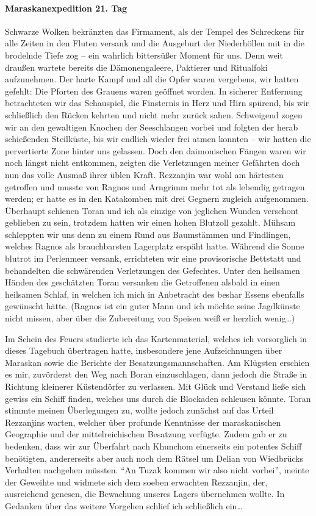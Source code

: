 \paragraph{Maraskanexpedition 21. Tag}
Schwarze Wolken bekränzten das Firmament, als der Tempel des Schreckens für alle Zeiten in den Fluten versank und die Ausgeburt der Niederhöllen mit in die brodelnde Tiefe zog -- ein wahrlich bittersüßer Moment für uns. Denn weit draußen wartete bereits die Dämonengaleere, Paktierer und Ritualfoki aufzunehmen. Der harte Kampf und all die Opfer waren vergebens, wir hatten gefehlt: Die Pforten des Grauens waren geöffnet worden. In sicherer Entfernung betrachteten wir das Schauspiel, die Finsternis in Herz und Hirn spürend, bis wir schließlich den Rücken kehrten und nicht mehr zurück sahen. Schweigend zogen wir an den gewaltigen Knochen der Seeschlangen vorbei und folgten der herab schießenden Steilküste, bis wir endlich wieder frei atmen konnten -- wir hatten die pervertierte Zone hinter uns gelassen. Doch den daimonischen Fängen waren wir noch längst nicht entkommen, zeigten die Verletzungen meiner Gefährten doch nun das volle Ausmaß ihrer üblen Kraft. Rezzanjin war wohl am härtesten getroffen und musste von Ragnos und Arngrimm mehr tot als lebendig getragen werden; er hatte es in den Katakomben mit drei Gegnern zugleich aufgenommen. Überhaupt schienen Toran und ich als einzige von jeglichen Wunden verschont geblieben zu sein, trotzdem hatten wir einen hohen Blutzoll gezahlt. Mühsam schleppten wir uns denn zu einem Rund aus Baumstämmen und Findlingen, welches Ragnos als brauchbarsten Lagerplatz erspäht hatte. Während die Sonne blutrot im Perlenmeer versank, errichteten wir eine provisorische Bettstatt und behandelten die schwärenden Verletzungen des Gefechtes. Unter den heilsamen Händen des geschätzten Toran versanken die Getroffenen alsbald in einen heilsamen Schlaf, in welchen ich mich in Anbetracht des beshar Essens ebenfalls gewünscht hätte. (Ragnos ist ein guter Mann und ich möchte seine Jagdkünste nicht missen, aber über die Zubereitung von Speisen weiß er herzlich wenig\dots)

Im Schein des Feuers studierte ich das Kartenmaterial, welches ich vorsorglich in dieses Tagebuch übertragen hatte, insbesondere jene Aufzeichnungen über Maraskan sowie die Berichte der Besatzungsmannschaften. Am Klügsten erschien es mir, zuvörderst den Weg nach Boran einzuschlagen, dann jedoch die Straße in Richtung kleinerer Küstendörfer zu verlassen. Mit Glück und Verstand ließe sich gewiss ein Schiff finden, welches uns durch die Blockaden schleusen könnte. Toran stimmte meinen Überlegungen zu, wollte jedoch zunächst auf das Urteil Rezzanjins warten, welcher über profunde Kenntnisse der maraskanischen Geographie und der mittelreichischen Besatzung verfügte. Zudem gab er zu bedenken, dass wir zur Überfahrt nach Khunchom einerseits ein potentes Schiff benötigten, andererseits aber auch noch dem Rätsel um Delian von Wiedbrücks Verhalten nachgehen müssten. ``An Tuzak kommen wir also nicht vorbei'', meinte der Geweihte und widmete sich dem soeben erwachten Rezzanjin, der, ausreichend genesen, die Bewachung unseres Lagers übernehmen wollte. In Gedanken über das weitere Vorgehen schlief ich schließlich ein\dots

